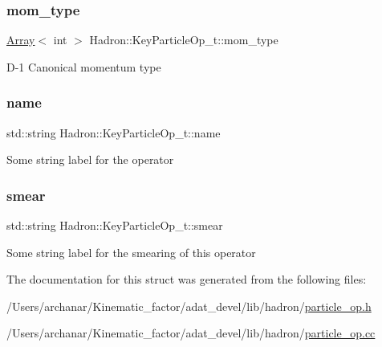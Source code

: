 \subsubsection{\texorpdfstring{mom\_type}{mom\_type}}
{\footnotesize\ttfamily \mbox{\hyperlink{classXMLArray_1_1Array}{Array}}$<$ int $>$ Hadron\+::\+Key\+Particle\+Op\+\_\+t\+::mom\+\_\+type}

D-\/1 Canonical momentum type \mbox{\label{structHadron_1_1KeyParticleOp__t_aa2f5e2300b1f43da6209d37aa8dba130}} 
\subsubsection{\texorpdfstring{name}{name}}
{\footnotesize\ttfamily std\+::string Hadron\+::\+Key\+Particle\+Op\+\_\+t\+::name}

Some string label for the operator \mbox{\label{structHadron_1_1KeyParticleOp__t_a5bf85aa6188a5ea919dd6fc935ef0eb5}} 
\subsubsection{\texorpdfstring{smear}{smear}}
{\footnotesize\ttfamily std\+::string Hadron\+::\+Key\+Particle\+Op\+\_\+t\+::smear}

Some string label for the smearing of this operator 

The documentation for this struct was generated from the following files\+:\begin{DoxyCompactItemize}
\item 
/\+Users/archanar/\+Kinematic\+\_\+factor/adat\+\_\+devel/lib/hadron/\mbox{\hyperlink{lib_2hadron_2particle__op_8h}{particle\+\_\+op.\+h}}\item 
/\+Users/archanar/\+Kinematic\+\_\+factor/adat\+\_\+devel/lib/hadron/\mbox{\hyperlink{particle__op_8cc}{particle\+\_\+op.\+cc}}\end{DoxyCompactItemize}
